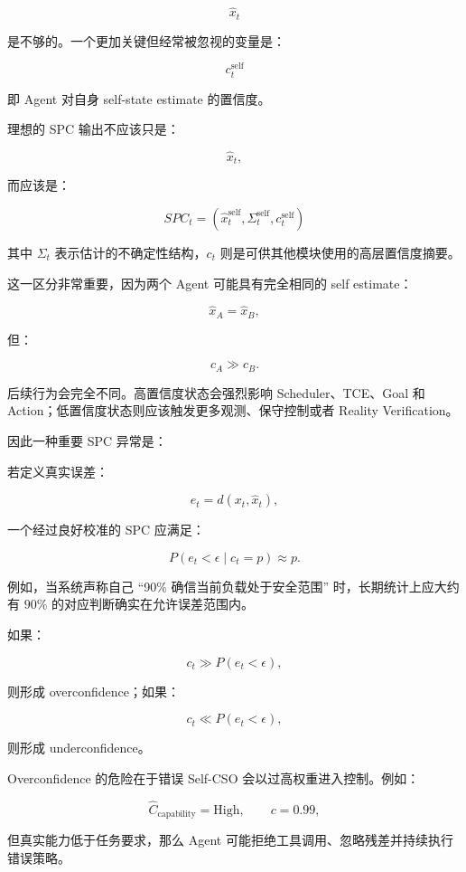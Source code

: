 \[
\hat{x}_t
\]

是不够的。一个更加关键但经常被忽视的变量是：

\[
c_t^{\mathrm{self}}
\]

即 Agent 对自身 self-state estimate 的置信度。

理想的 SPC 输出不应该只是：

\[
\hat{x}_t,
\]

而应该是：

\[
\boxed{
SPC_t
=
(
\hat{x}_t^{\mathrm{self}},
\Sigma_t^{\mathrm{self}},
c_t^{\mathrm{self}}
)
}
\]

其中 $\Sigma_t$ 表示估计的不确定性结构，$c_t$ 则是可供其他模块使用的高层置信度摘要。

这一区分非常重要，因为两个 Agent 可能具有完全相同的 self estimate：

\[
\hat{x}_A=\hat{x}_B,
\]

但：

\[
c_A\gg c_B.
\]

后续行为会完全不同。高置信度状态会强烈影响 Scheduler、TCE、Goal 和 Action；低置信度状态则应该触发更多观测、保守控制或者 Reality Verification。

因此一种重要 SPC 异常是：

\begin{statementbox}
\centering
{}
\end{statementbox}

若定义真实误差：

\[
e_t=d(x_t,\hat{x}_t),
\]

一个经过良好校准的 SPC 应满足：

\[
P
\left(
e_t<\epsilon
\mid
c_t=p
\right)
\approx p.
\]

例如，当系统声称自己 ``90\% 确信当前负载处于安全范围'' 时，长期统计上应大约有 $90\%$ 的对应判断确实在允许误差范围内。

如果：

\[
c_t\gg P(e_t<\epsilon),
\]

则形成 overconfidence；如果：

\[
c_t\ll P(e_t<\epsilon),
\]

则形成 underconfidence。

Overconfidence 的危险在于错误 Self-CSO 会以过高权重进入控制。例如：

\[
\hat C_{\mathrm{capability}}=\mathrm{High},
\qquad
c=0.99,
\]

但真实能力低于任务要求，那么 Agent 可能拒绝工具调用、忽略残差并持续执行错误策略。

